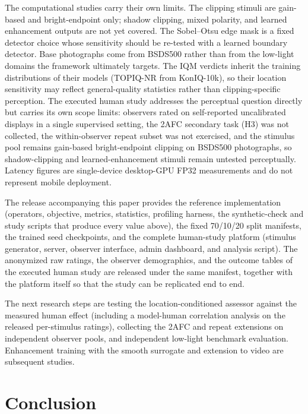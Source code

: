 \documentclass[5p,times,twocolumn]{elsarticle}
\begin{document}
The computational studies carry their own limits. The clipping stimuli are
gain-based and bright-endpoint only; shadow clipping, mixed polarity, and
learned enhancement outputs are not yet covered. The Sobel--Otsu edge mask is
a fixed detector choice whose sensitivity should be re-tested with a learned
boundary detector. Base photographs come from BSDS500 rather than from the
low-light domains the framework ultimately targets. The IQM verdicts inherit
the training distributions of their models (TOPIQ-NR from KonIQ-10k), so
their location sensitivity may reflect general-quality statistics rather than
clipping-specific perception. The executed human study addresses the
perceptual question directly but carries its own scope limits: observers
rated on self-reported uncalibrated displays in a single supervised setting,
the 2AFC secondary task (H3) was not collected, the within-observer repeat
subset was not exercised, and the stimulus pool remains gain-based
bright-endpoint clipping on BSDS500 photographs, so shadow-clipping and
learned-enhancement stimuli remain untested perceptually. Latency figures are
single-device desktop-GPU FP32 measurements and do not represent mobile
deployment.

The release accompanying this paper provides the reference implementation
(operators, objective, metrics, statistics, profiling harness, the
synthetic-check and study scripts that produce every value above), the fixed
70/10/20 split manifests, the trained seed checkpoints, and the complete
human-study platform (stimulus generator, server, observer interface, admin
dashboard, and analysis script). The anonymized raw ratings, the observer
demographics, and the outcome tables of the executed human study are released
under the same manifest, together with the platform itself so that the study
can be replicated end to end.

The next research steps are testing the location-conditioned assessor against
the measured human effect (including a model-human correlation analysis on
the released per-stimulus ratings), collecting the 2AFC and repeat extensions
on independent observer pools, and independent low-light benchmark
evaluation. Enhancement training with the smooth surrogate and extension to
video are subsequent studies.

\section{Conclusion}
\label{sec:conclusion}
\end{document}
